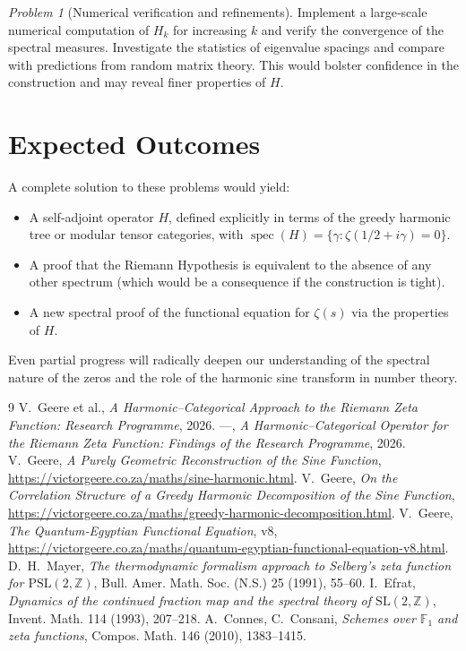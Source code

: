 \documentclass[11pt,a4paper]{article}
\theoremstyle{remark}
\newtheorem{problem}{Problem}[section]
\DeclareMathOperator{\spec}{spec}
\begin{document}
\begin{problem}[Numerical verification and refinements]
Implement a large‑scale numerical computation of $H_k$ for increasing $k$ and verify the convergence of the spectral measures. Investigate the statistics of eigenvalue spacings and compare with predictions from random matrix theory. This would bolster confidence in the construction and may reveal finer properties of $H$.
\end{problem}

\section{Expected Outcomes}
A complete solution to these problems would yield:
\begin{itemize}
\item A self‑adjoint operator $H$, defined explicitly in terms of the greedy harmonic tree or modular tensor categories, with $\spec(H)=\{\gamma:\zeta(1/2+i\gamma)=0\}$.
\item A proof that the Riemann Hypothesis is equivalent to the absence of any other spectrum (which would be a consequence if the construction is tight).
\item A new spectral proof of the functional equation for $\zeta(s)$ via the properties of $H$.
\end{itemize}
Even partial progress will radically deepen our understanding of the spectral nature of the zeros and the role of the harmonic sine transform in number theory.

\begin{thebibliography}{9}
 V.~Geere et al., \emph{A Harmonic–Categorical Approach to the Riemann Zeta Function: Research Programme}, 2026.
 ---, \emph{A Harmonic–Categorical Operator for the Riemann Zeta Function: Findings of the Research Programme}, 2026.
 V.~Geere, \emph{A Purely Geometric Reconstruction of the Sine Function}, \url{https://victorgeere.co.za/maths/sine-harmonic.html}.
 V.~Geere, \emph{On the Correlation Structure of a Greedy Harmonic Decomposition of the Sine Function}, \url{https://victorgeere.co.za/maths/greedy-harmonic-decomposition.html}.
 V.~Geere, \emph{The Quantum‑Egyptian Functional Equation}, v8, \url{https://victorgeere.co.za/maths/quantum-egyptian-functional-equation-v8.html}.
 D.~H.~Mayer, \emph{The thermodynamic formalism approach to Selberg's zeta function for $\mathrm{PSL}(2,\mathbb{Z})$}, Bull. Amer. Math. Soc. (N.S.) 25 (1991), 55--60.
 I.~Efrat, \emph{Dynamics of the continued fraction map and the spectral theory of $\mathrm{SL}(2,\mathbb{Z})$}, Invent. Math. 114 (1993), 207--218.
 A.~Connes, C.~Consani, \emph{Schemes over $\mathbb{F}_1$ and zeta functions}, Compos. Math. 146 (2010), 1383--1415.
\end{thebibliography}
\end{document}
